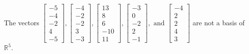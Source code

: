 \begin{exercise}
\begin{exerciseStatement}
  \end{exerciseStatement}
  \begin{exerciseAnswer}
   The vectors \(\left[\begin{array}{r}
-5 \\
-4 \\
-2 \\
4 \\
-5
\end{array}\right] , \left[\begin{array}{r}
-4 \\
-2 \\
-2 \\
3 \\
-3
\end{array}\right] , \left[\begin{array}{r}
13 \\
8 \\
6 \\
-10 \\
11
\end{array}\right] , \left[\begin{array}{r}
-3 \\
0 \\
-2 \\
2 \\
-1
\end{array}\right] , \text{ and } \left[\begin{array}{r}
-4 \\
2 \\
2 \\
4 \\
3
\end{array}\right]\) 
  	 are not  a basis of \(\mathbb{R}^5\).
  


  \end{exerciseAnswer}
\end{exercise}